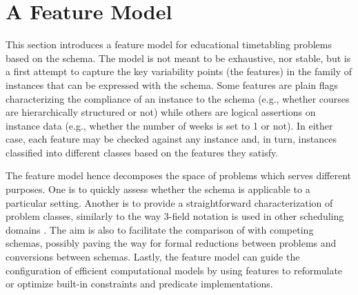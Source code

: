 \section{A Feature Model}
\label{sec:feature-model}
This section introduces a feature model
for educational timetabling problems
based on the \UTP{} schema.
The model is not meant to be exhaustive, nor stable,
but is a first attempt
to capture %
the key variability points  (the features)
in the family of instances
that can be expressed with the schema.
Some features are plain flags characterizing the compliance of an instance to the schema (e.g., whether courses are hierarchically structured or not)
while others are logical assertions on instance data (e.g., whether the number of weeks is set to 1 or not).
In either case, each feature may be checked against any instance
and, in turn, instances classified into different classes
based on the features they satisfy.

The feature model hence decomposes the space of \UTP{} problems
which serves different purposes.
One is to quickly assess whether 
the schema 
is applicable to %
a particular setting. %
Another is to provide a straightforward characterization of problem classes,
similarly to the way 3-field notation is used in other scheduling domains \cite{1979_graham_ADM,robinX_3field,scheduling_zoo}.%
The aim is also to facilitate the comparison of \UTP{} with competing schemas, %
possibly paving the way for formal reductions between problems
and conversions between schemas.
Lastly, the feature model can guide the configuration of efficient computational models
by using features to reformulate or optimize %
built-in constraints and predicate implementations.

%  

